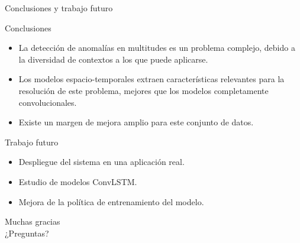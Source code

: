 \documentclass[10pt]{beamer}
\begin{document}
\begin{frame}{Conclusiones y trabajo futuro}
  \begin{block}{Conclusiones}
    \begin{itemize}
    \item La detección de anomalías en multitudes es un problema
      complejo, debido a la diversidad de contextos a los que puede
      aplicarse.
    \item Los modelos espacio-temporales extraen características
      relevantes para la resolución de este problema, mejores que los
      modelos completamente convolucionales.
    \item Existe un margen de mejora amplio para este conjunto de datos.
    \end{itemize}
  \end{block}
  \begin{block}{Trabajo futuro}
    \begin{itemize}
    \item Despliegue del sistema en una aplicación real.
    \item Estudio de modelos ConvLSTM.
    \item Mejora de la política de entrenamiento del modelo.
    \end{itemize}
  \end{block}
\end{frame}

\begin{frame}[standout]
  \LARGE{Muchas gracias}\\
  \LARGE{¿Preguntas?}
\end{frame}
\end{document}
